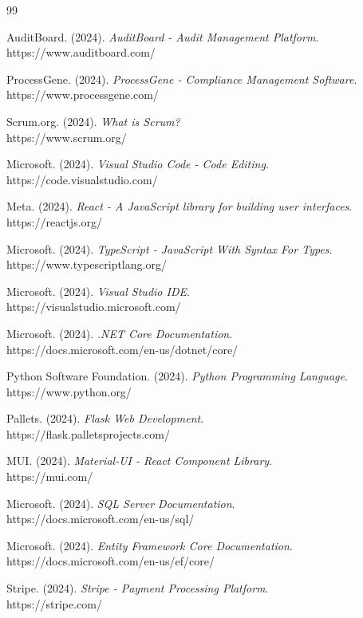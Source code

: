 \adjustmtc
\renewcommand\bibname{WEBOGRAPHIE}
\begin{thebibliography}{99}
\thispagestyle{MyStyle}


AuditBoard. (2024). \textit{AuditBoard - Audit Management Platform}. \\
https://www.auditboard.com/

ProcessGene. (2024). \textit{ProcessGene - Compliance Management Software}. \\
https://www.processgene.com/

Scrum.org. (2024). \textit{What is Scrum?} \\
https://www.scrum.org/

Microsoft. (2024). \textit{Visual Studio Code - Code Editing}. \\
https://code.visualstudio.com/

Meta. (2024). \textit{React - A JavaScript library for building user interfaces}. \\
https://reactjs.org/

Microsoft. (2024). \textit{TypeScript - JavaScript With Syntax For Types}. \\
https://www.typescriptlang.org/

Microsoft. (2024). \textit{Visual Studio IDE}. \\
https://visualstudio.microsoft.com/

Microsoft. (2024). \textit{.NET Core Documentation}. \\
https://docs.microsoft.com/en-us/dotnet/core/

Python Software Foundation. (2024). \textit{Python Programming Language}. \\
https://www.python.org/

Pallets. (2024). \textit{Flask Web Development}. \\
https://flask.palletsprojects.com/ 

MUI. (2024). \textit{Material-UI - React Component Library}. \\
https://mui.com/

Microsoft. (2024). \textit{SQL Server Documentation}. \\
https://docs.microsoft.com/en-us/sql/

Microsoft. (2024). \textit{Entity Framework Core Documentation}. \\
https://docs.microsoft.com/en-us/ef/core/

Stripe. (2024). \textit{Stripe - Payment Processing Platform}. \\
https://stripe.com/

\end{thebibliography}